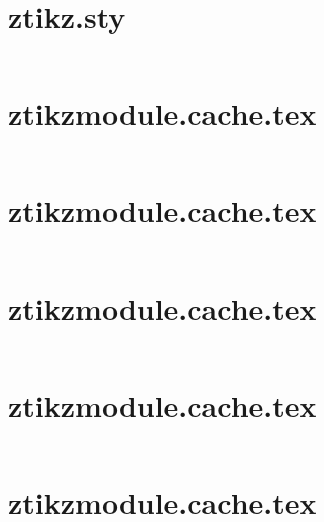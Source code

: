 \documentclass[
  hyper,    
  lang=cn,
  class=book,
  bib_index={load},
  mathSpec={envStyle=leftbar, alias},
  toc={column=2, title=目录},
]{zlatex}
\begin{document}
\chapter{ztikz.sty}\thispagestyle{empty}
\inputminted{latex}{ztikz.sty}


\chapter{ztikzmodule.cache.tex}\thispagestyle{empty}
\inputminted{latex}{ztikzmodule.cache.tex}


\chapter{ztikzmodule.cache.tex}\thispagestyle{empty}
\inputminted{latex}{ztikzmodule.gnuplot.tex}


\chapter{ztikzmodule.cache.tex}\thispagestyle{empty}
\inputminted{latex}{ztikzmodule.python.tex}


\chapter{ztikzmodule.cache.tex}\thispagestyle{empty}
\inputminted{latex}{ztikzmodule.wolfram.tex}


\chapter{ztikzmodule.cache.tex}\thispagestyle{empty}
\inputminted{latex}{ztikzmodule.zdraw.tex}
\end{document}
